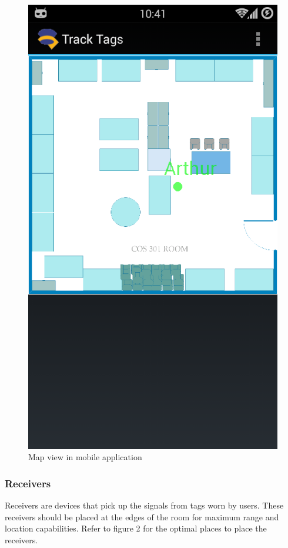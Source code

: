\documentclass{article}
\begin{document}
\begin{figure}[H]
\centering
\includegraphics[scale=0.3]{MainAppTrack Tags.png}
\caption{Map view in mobile application}
\end{figure}

\subsubsection{Receivers}
Receivers are devices that pick up the signals from tags worn by users. These receivers should be placed at the edges of the room for maximum range and location capabilities.  Refer to figure 2 for the optimal places to place the receivers.
\end{document}
